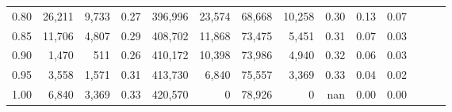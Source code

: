 \begin{tabular}{rrrrrrrrrrrrrr}
0.80 &  26,211 &   9,733 &  0.27 &  396,996 &   23,574 &  68,668 &  10,258 &  0.30 &  0.13 &      0.07 \\
0.85 &  11,706 &   4,807 &  0.29 &  408,702 &   11,868 &  73,475 &   5,451 &  0.31 &  0.07 &      0.03 \\
0.90 &   1,470 &     511 &  0.26 &  410,172 &   10,398 &  73,986 &   4,940 &  0.32 &  0.06 &      0.03 \\
0.95 &   3,558 &   1,571 &  0.31 &  413,730 &    6,840 &  75,557 &   3,369 &  0.33 &  0.04 &      0.02 \\
1.00 &   6,840 &   3,369 &  0.33 &  420,570 &        0 &  78,926 &       0 &   nan &  0.00 &      0.00 \\
\bottomrule
\end{tabular}
